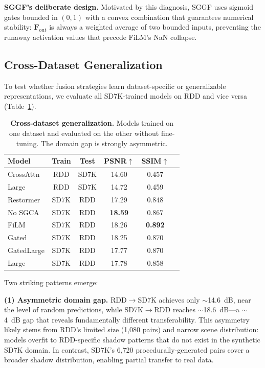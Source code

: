 \documentclass[11pt]{article}
\begin{document}
\textbf{SGGF's deliberate design.} Motivated by this diagnosis, SGGF uses sigmoid gates bounded in $(0,1)$ with a convex combination that guarantees numerical stability: $\mathbf{F}_{\text{out}}$ is always a weighted average of two bounded inputs, preventing the runaway activation values that precede FiLM's NaN collapse.

\subsection{Cross-Dataset Generalization}
\label{sec:cross_dataset}

To test whether fusion strategies learn dataset-specific or generalizable representations, we evaluate all SD7K-trained models on RDD and vice versa (Table~\ref{tab:cross_dataset}).

\begin{table}[t]
\centering
\caption{\textbf{Cross-dataset generalization.} Models trained on one dataset and evaluated on the other without fine-tuning. The domain gap is strongly asymmetric.}
\label{tab:cross_dataset}
\begin{tabular}{@{}lccccc@{}}
\toprule
\textbf{Model} & \textbf{Train} & \textbf{Test} & \textbf{PSNR$\uparrow$} & \textbf{SSIM$\uparrow$} \\
\midrule
CrossAttn  & RDD & SD7K & 14.60 & 0.457 \\
Large      & RDD & SD7K & 14.72 & 0.459 \\
\midrule
Restormer   & SD7K & RDD & 17.29 & 0.848 \\
No SGCA     & SD7K & RDD & \textbf{18.59} & 0.867 \\
FiLM        & SD7K & RDD & 18.26 & \textbf{0.892} \\
Gated       & SD7K & RDD & 18.25 & 0.870 \\
GatedLarge  & SD7K & RDD & 17.77 & 0.870 \\
Large       & SD7K & RDD & 17.78 & 0.858 \\
\bottomrule
\end{tabular}
\end{table}

Two striking patterns emerge:

\textbf{(1) Asymmetric domain gap.} RDD$\rightarrow$SD7K achieves only $\sim$14.6~dB, near the level of random predictions, while SD7K$\rightarrow$RDD reaches $\sim$18.6~dB---a $\sim$4~dB gap that reveals fundamentally different transferability.
This asymmetry likely stems from RDD's limited size (1,080 pairs) and narrow scene distribution: models overfit to RDD-specific shadow patterns that do not exist in the synthetic SD7K domain.
In contrast, SD7K's 6,720 procedurally-generated pairs cover a broader shadow distribution, enabling partial transfer to real data.
\end{document}
